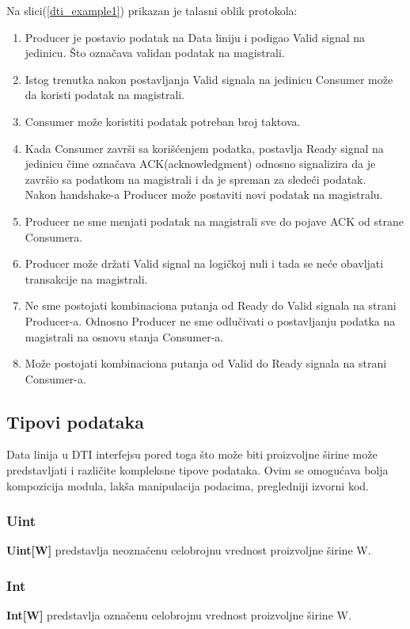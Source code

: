 Na slici(\ref{dti_example1}) prikazan je talasni oblik protokola:
\begin{enumerate}
\item Producer je postavio podatak na Data liniju i podigao Valid signal na
  jedinicu. Što označava validan podatak na magistrali.
\item Istog trenutka nakon postavljanja Valid signala na jedinicu Consumer može
  da koristi podatak na magistrali.
\item Consumer može koristiti podatak potreban broj taktova.
\item Kada Consumer završi sa korišćenjem podatka, postavlja Ready signal na
  jedinicu čime označava ACK(acknowledgment) odnosno signalizira da je završio
  sa podatkom na magistrali i da je spreman za sledeći podatak. \\
  Nakon handshake-a Producer može postaviti novi podatak na magistralu.
\item Producer ne sme menjati podatak na magistrali sve do pojave ACK od strane
  Consumera.
\item Producer može držati Valid signal na logičkoj nuli i tada se neće
  obavljati transakcije na magistrali.
\item Ne sme postojati kombinaciona putanja od Ready do Valid signala na strani
  Producer-a.
  Odnosno Producer ne sme odlučivati o postavljanju podatka na magistrali na
  osnovu stanja Consumer-a.
\item Može postojati kombinaciona putanja od Valid do Ready signala na strani
  Consumer-a.

\end{enumerate}

\subsection{Tipovi podataka} \label{pygears_data_types}

Data linija u DTI interfejsu pored toga što može biti proizvoljne širine može
predstavljati i različite kompleksne tipove podataka.
Ovim se omogućava bolja kompozicija modula, lakša manipulacija podacima,
pregledniji izvorni kod.

\subsubsection{Uint} \label{uint_sec}
\textbf{Uint[W]} predstavlja neoznačenu celobrojnu vrednost proizvoljne
širine W.

\subsubsection{Int} \label{int_sec}
\textbf{Int[W]} predstavlja označenu celobrojnu vrednost proizvoljne
  širine W.

